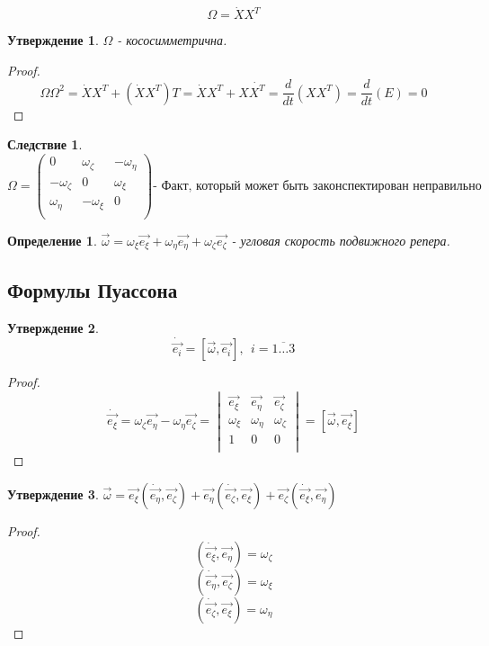 \documentclass{article}
\renewcommand{\v}[1]{{\vec{#1}}}
\newtheorem*{df}{Определение}
\newtheorem{ass}{Утверждение}
\newtheorem*{cor}{Следствие}
\begin{document}
  $$ \Omega = \dot X X^T $$

  
  \begin{ass}
  $\Omega$ - кососимметрична.
  \end{ass}
  \begin{proof}
  $$ \Omega \Omega^2 = \dot X X^T + (\dot X X^T)T = \dot X X^T + X \dot {X^T} = \frac{d}{dt}(XX^T) = 
  \frac{d}{dt}(E) = 0 $$
  \end{proof}
  
  \begin{cor}
  $$ \Omega =
  \left(
  \begin{matrix}
  0 & \omega_{\zeta} & -\omega_{\eta} \\
  -\omega_{\zeta} & 0 & \omega_{\xi} \\
  \omega_{\eta} & -\omega_{\xi} & 0 \\
  \end{matrix}
  \right)
  \text{- Факт, который может быть законспектирован неправильно}
  $$
  \end{cor}
  
  \begin{df}
  $ \v{\omega} = \omega_{\xi}\v{e_{\xi}} + \omega_{\eta}\v{e_{\eta}} + \omega_{\zeta}\v{e_{\zeta}} $ - угловая скорость подвижного репера.
  \end{df}
  
  \subsection{Формулы Пуассона}
  \begin{ass}
  $$ \dot{\v{e_i}} = [\v{\omega}, \v{e_i}],~~ i = \overline{1 \ldots 3} $$
  \end{ass}
  \begin{proof}
  $$
  \dot{\v{e_{\xi}}} = \omega_{\zeta} \v{e_{\eta}} - \omega_{\eta} \v{e_{\zeta}} =
  \begin{vmatrix}
  \v{e_{\xi}} & \v{e_{\eta}} & \v{e_{\zeta}} \\
  \omega_{\xi} & \omega_{\eta} & \omega_{\zeta} \\
  1 & 0 & 0 \\ 
  \end{vmatrix}
  =
  [\v{\omega}, \v{e_{\xi}}] 
  $$
  \end{proof}
  
  \begin{ass}
  $ \v{\omega} = \v{e_{\xi}}(\dot{\v{e_{\eta}}}, \v{e_{\zeta}}) + \v{e_{\eta}}(\dot{\v{e_{\zeta}}}, \v{e_{\xi}}) + \v{e_{\zeta}}(\dot{\v{e_{\xi}}}, \v{e_{\eta}}) $
  \end{ass}
  \begin{proof}
  $$ (\dot{\v{e_{\xi}}}, \v{e_{\eta}}) = \omega_{\zeta} $$
  $$ (\dot{\v{e_{\eta}}}, \v{e_{\zeta}}) = \omega_{\xi} $$
  $$ (\dot{\v{e_{\zeta}}}, \v{e_{\xi}}) = \omega_{\eta} $$
  \end{proof}
  
\end{document}
